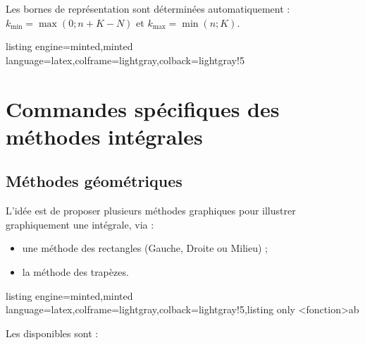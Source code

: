 \documentclass[11pt,a4paper]{ltxdoc}
\begin{document}
Les bornes de représentation sont déterminées automatiquement : $k_{\min} = \max(0;n+K-N)$ et $k_{\max} = \min(n;K)$.

\begin{tcblisting}{listing engine=minted,minted language=latex,colframe=lightgray,colback=lightgray!5}
\begin{GraphiqueTikz}%
    [x=1.5cm,y=10cm,Xgrille=1,Ygrille=0.1,Ygrilles=0.05, Xmin=-1,Xmax=8,Ymin=0,Ymax=0.40]
\end{GraphiqueTikz}
\end{tcblisting}

\pagebreak

\section{Commandes spécifiques des méthodes intégrales}

\subsection{Méthodes géométriques}\label{methodesintergrales}

L'idée est de proposer plusieurs méthodes graphiques pour illustrer graphiquement une intégrale, via :

\begin{itemize}
  \item une méthode des rectangles (Gauche, Droite ou Milieu) ;
  \item la méthode des trapèzes.
\end{itemize}

\begin{tcblisting}{listing engine=minted,minted language=latex,colframe=lightgray,colback=lightgray!5,listing only}
\RepresenterMethodeIntegrale[clés]<fonction>{a}{b}
\end{tcblisting}

Les  disponibles sont :
\end{document}

